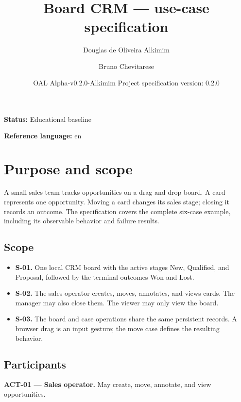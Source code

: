 \documentclass[10pt,a4paper]{article}
\begin{document}
\title{Board CRM --- use-case specification}

\author{Douglas de Oliveira Alkimim \and Bruno Chevitarese}

\date{OAL Alpha-v0.2.0-Alkimim \quad Project specification version: 0.2.0}

\maketitle

\textbf{Status:} Educational baseline

\textbf{Reference language:} en

\section{Purpose and scope}

A small sales team tracks opportunities on a drag-and-drop board. A card represents one opportunity. Moving a card changes its sales stage; closing it records an outcome. The specification covers the complete six-case example, including its observable behavior and failure results.

\subsection{Scope}

\begin{itemize}

\item \textbf{S-01.} One local CRM board with the active stages New, Qualified, and Proposal, followed by the terminal outcomes Won and Lost.

\item \textbf{S-02.} The sales operator creates, moves, annotates, and views cards. The manager may also close them. The viewer may only view the board.

\item \textbf{S-03.} The board and case operations share the same persistent records. A browser drag is an input gesture; the move case defines the resulting behavior.

\end{itemize}

\subsection{Participants}

\textbf{ACT-01 --- Sales operator.} May create, move, annotate, and view opportunities.
\end{document}
